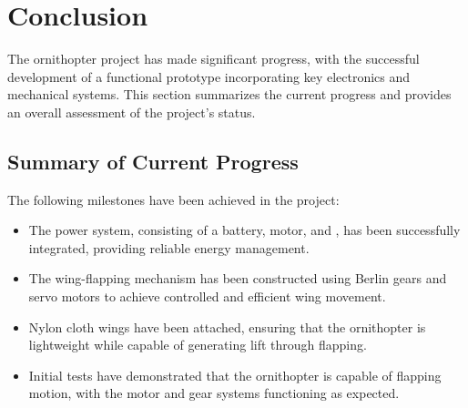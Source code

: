 \chapter{Conclusion}

The ornithopter project has made significant progress, with the successful development of a functional prototype incorporating key electronics and mechanical systems. This section summarizes the current progress and provides an overall assessment of the project's status.

\section{Summary of Current Progress}
The following milestones have been achieved in the project:

\begin{itemize}
    \item The power system, consisting of a \lipo battery, \bldc motor, and \esc, has been successfully integrated, providing reliable energy management.
    
    \item The wing-flapping mechanism has been constructed using Berlin gears and servo motors to achieve controlled and efficient wing movement.
    
    \item Nylon cloth wings have been attached, ensuring that the ornithopter is lightweight while capable of generating lift through flapping.
    
    \item Initial tests have demonstrated that the ornithopter is capable of flapping motion, with the motor and gear systems functioning as expected.
\end{itemize}

